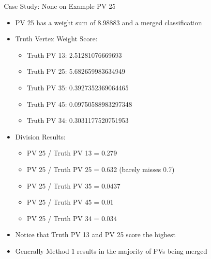 \documentclass[xcolor=table,aspectratio=169]{beamer}
\begin{document}
\begin{frame}{Case Study: None on Example PV 25}
    \begin{itemize}
        \item PV 25 has a weight sum of 8.98883 and a merged classification
        \item Truth Vertex Weight Score:
        \begin{itemize}
            \item Truth PV 13: 2.51281076669693
            \item Truth PV 25: 5.682659983634949
            \item Truth PV 35: 0.3927352369064465
            \item Truth PV 45: 0.09750588983297348
            \item Truth PV 34: 0.3031177520751953
        \end{itemize}
        \item Division Results:
        \begin{itemize}
            \item PV 25 / Truth PV 13 = 0.279
            \item PV 25 / Truth PV 25 = 0.632 (barely misses 0.7)
            \item PV 25 / Truth PV 35 = 0.0437
            \item PV 25 / Truth PV 45 = 0.01
            \item PV 25 / Truth PV 34 = 0.034
        \end{itemize}
        \item Notice that Truth PV 13 and PV 25 score the highest
        \item Generally Method 1 results in the majority of PVs being merged
    \end{itemize}
\end{frame}
\end{document}

